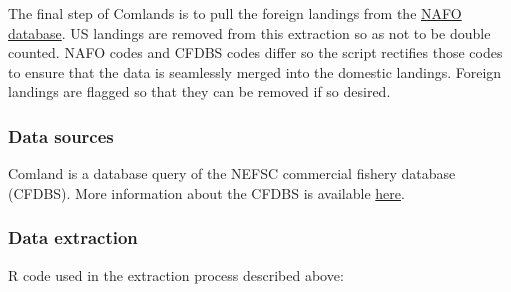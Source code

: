 \documentclass[]{article}
\begin{document}
The final step of Comlands is to pull the foreign landings from the
\href{https://www.nafo.int/Data/frames}{NAFO database}. US landings are
removed from this extraction so as not to be double counted. NAFO codes
and CFDBS codes differ so the script rectifies those codes to ensure
that the data is seamlessly merged into the domestic landings. Foreign
landings are flagged so that they can be removed if so desired.

\subsubsection{Data sources}\label{data-sources}

Comland is a database query of the NEFSC commercial fishery database
(CFDBS). More information about the CFDBS is available
\href{https://inport.nmfs.noaa.gov/inport/item/27401}{here}.

\subsubsection{Data extraction}\label{data-extraction}

R code used in the extraction process described above:
\end{document}
